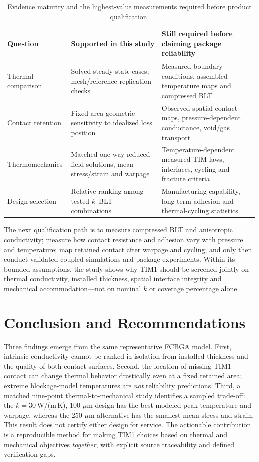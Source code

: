 \documentclass[10pt,a4paper]{article}
\begin{document}
\begin{table}[htbp]\centering
\caption{Evidence maturity and the highest-value measurements required before product qualification.}
\label{tab:maturity}
\footnotesize
\begin{tabularx}{\linewidth}{@{}p{31mm}p{53mm}Y@{}}
\toprule
Question & Supported in this study & Still required before claiming package reliability\\\midrule
Thermal comparison & Solved steady-state cases; mesh/reference replication checks & Measured boundary conditions, assembled temperature maps and compressed BLT\\
Contact retention & Fixed-area geometric sensitivity to idealized loss position & Observed spatial contact maps, pressure-dependent conductance, void/gas transport\\
Thermomechanics & Matched one-way reduced-field solutions, mean stress/strain and warpage & Temperature-dependent measured TIM laws, interfaces, cycling and fracture criteria\\
Design selection & Relative ranking among tested $k$--BLT combinations & Manufacturing capability, long-term adhesion and thermal-cycling statistics\\
\bottomrule
\end{tabularx}
\end{table}
\FloatBarrier

The next qualification path is to measure compressed BLT and anisotropic conductivity;
measure how contact resistance and adhesion vary with pressure and temperature;
map retained contact after warpage and cycling; and only then conduct
validated coupled simulations and package experiments.
Within its bounded assumptions, the study shows why TIM1 should be screened jointly
on thermal conductivity, installed thickness, spatial interface integrity and mechanical
accommodation---not on nominal $k$ or coverage percentage alone.


\section{Conclusion and Recommendations}
Three findings emerge from the same representative FCBGA model.
First, intrinsic conductivity cannot be ranked in isolation from installed thickness and
the quality of both contact surfaces. Second, the location of missing TIM1 contact
can change thermal behavior drastically even at a fixed retained area; extreme
blockage-model temperatures are \emph{not} reliability predictions.
Third, a matched nine-point thermal-to-mechanical study identifies a sampled
trade-off: the $k=30$\,W/(m\,K), 100-$\mu$m design has the best modeled
peak temperature and warpage, whereas the 250-$\mu$m alternative has the
smallest mean stress and strain. This result does not certify either design for service.
The actionable contribution is a reproducible method for making TIM1 choices
based on thermal and mechanical objectives \emph{together}, with explicit
source traceability and defined verification gaps.

{\small


}
\end{document}
